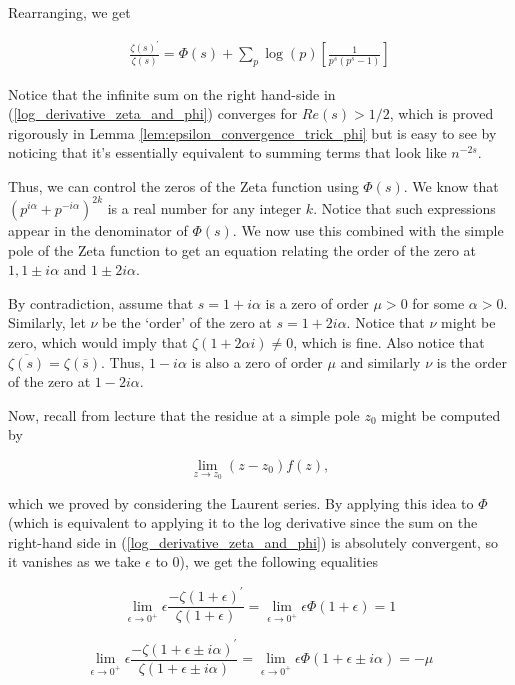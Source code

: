 \documentclass{article}
\theoremstyle{definition}
\begin{document}
Rearranging, we get

\begin{align}\label{log_derivative_zeta_and_phi}
    \frac{\zeta(s)^{\prime}}{\zeta(s)} = \Phi(s) + \sum_{p} \log(p)[\frac{1}{p^{s}(p^{s} - 1)}] 
\end{align}

Notice that the infinite sum on the right hand-side in (\ref{log_derivative_zeta_and_phi}) converges for $ Re(s) > 1/2 $,
which is proved rigorously in Lemma \ref{lem:epsilon_convergence_trick_phi} but is easy 
to see by noticing that it's essentially equivalent to summing terms that look like
$ n^{-2s} $.

Thus, we can control the zeros of the Zeta function using $ \Phi(s) $. We know that $ (p^{i \alpha} + p^{-i \alpha})^{2k} $
is a real number for any integer $ k $. Notice that such expressions appear in the denominator
of $ \Phi(s) $. We now use this combined with the simple pole of the Zeta function to get
an equation relating the order of the zero at $ 1, 1 \pm i \alpha $ and $ 1 \pm 2i \alpha $.

By contradiction, assume that $ s = 1 + i \alpha $ is a zero of order $ \mu > 0 $
for some $ \alpha > 0 $. Similarly, let $ \nu $ be the `order' of the zero at 
$ s = 1 + 2i \alpha $. Notice that $ \nu $ might be zero, which would imply
that $ \zeta(1 + 2 \alpha i) \neq 0 $, which is fine. Also notice that $ \overline{\zeta(s)} = \zeta(\overline{s}) $.
Thus, $ 1 - i \alpha $ is also a zero of order $ \mu $ and similarly $ \nu $ is the order
of the zero at $ 1 - 2 i \alpha $.

Now, recall from lecture that the residue at a simple pole $ z_{0} $
might be computed by 

\[ \lim_{z \to z_{0}} (z - z_{0})f(z), \]

which we proved by considering the Laurent series. By applying this idea to $ \Phi $ 
(which is equivalent to applying it to the log derivative since the sum 
on the right-hand side in (\ref{log_derivative_zeta_and_phi}) is absolutely convergent, so it vanishes as we take $ \epsilon $ to 0), we get the following equalities

\[ \lim_{\epsilon \to 0^{+}} \epsilon  \frac{-\zeta(1 + \epsilon)^{\prime}}{\zeta(1 + \epsilon)}  = \lim_{\epsilon \to 0^{+}}  \epsilon \Phi(1 + \epsilon) = 1 \]

\[ \lim_{\epsilon \to 0^{+}} \epsilon  \frac{-\zeta(1 + \epsilon \pm i\alpha)^{\prime}}{\zeta(1 + \epsilon \pm i\alpha)}  = \lim_{\epsilon \to 0^{+}} \epsilon \Phi(1 + \epsilon \pm i\alpha) = - \mu \]
\end{document}

